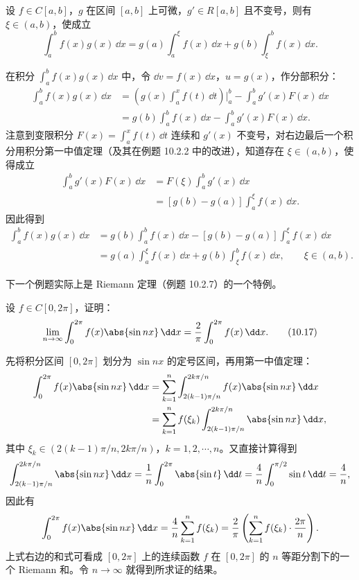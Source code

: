\begin{xexample}[10.4.11]
设 $f\in C[a,b]$，$g$ 在区间 $[a,b]$ 上可微，$g'\in R[a,b]$ 且不变号，则有 $\xi\in(a,b)$，使成立
\[
  \int_a^b f(x)g(x)\,\dd x
  =g(a)\int_a^\xi f(x)\,\dd x+g(b)\int_\xi^b f(x)\,\dd x.
\]
\end{xexample}
\begin{xsolution}
在积分 $\int_a^b f(x)g(x)\,\dd x$ 中，令 $\dd v=f(x)\,\dd x$，$u=g(x)$，作分部积分：
\begin{align*}
  \int_a^b f(x)g(x)\,\dd x
  &=\left(g(x)\int_a^x f(t)\,\dd t\right)\Big|_a^b
    -\int_a^b g'(x)F(x)\,\dd x\\
  &=g(b)\int_a^b f(x)\,\dd x-\int_a^b g'(x)F(x)\,\dd x.
\end{align*}
注意到变限积分 $F(x)=\int_a^x f(t)\,\dd t$ 连续和 $g'(x)$ 不变号，对右边最后一个积分用积分第一中值定理（及其在例题 10.2.2 中的改进），知道存在 $\xi\in(a,b)$，使得成立
\begin{align*}
  \int_a^b g'(x)F(x)\,\dd x
  &=F(\xi)\int_a^b g'(x)\,\dd x\\
  &=[g(b)-g(a)]\int_a^\xi f(x)\,\dd x.
\end{align*}
因此得到
\begin{align*}
  \int_a^b f(x)g(x)\,\dd x
  &=g(b)\int_a^b f(x)\,\dd x-[g(b)-g(a)]\int_a^\xi f(x)\,\dd x\\
  &=g(a)\int_a^\xi f(x)\,\dd x+g(b)\int_\xi^b f(x)\,\dd x,
  \qquad \xi\in(a,b).
\end{align*}
\end{xsolution}

下一个例题实际上是 Riemann 定理（例题 10.2.7）的一个特例。

\begin{xexample}[10.4.12]
设 $f\in C[0,2\pi]$，证明：
\begin{equation}
  \lim_{n\to\infty}\int_0^{2\pi}f(x)\abs{\sin nx}\,\dd x
  =\frac2\pi\int_0^{2\pi}f(x)\,\dd x.
  \tag{10.17}
  \label{eq:10.17}
\end{equation}
\end{xexample}
\begin{xsolution}
先将积分区间 $[0,2\pi]$ 划分为 $\sin nx$ 的定号区间，再用第一中值定理：
\begin{align*}
  \int_0^{2\pi}f(x)\abs{\sin nx}\,\dd x
  &=\sum_{k=1}^n\int_{2(k-1)\pi/n}^{2k\pi/n}f(x)\abs{\sin nx}\,\dd x\\
  &=\sum_{k=1}^n f(\xi_k)\int_{2(k-1)\pi/n}^{2k\pi/n}\abs{\sin nx}\,\dd x,
\end{align*}
其中 $\xi_k\in(2(k-1)\pi/n,2k\pi/n)$，$k=1,2,\cdots,n$。又直接计算得到
\[
  \int_{2(k-1)\pi/n}^{2k\pi/n}\abs{\sin nx}\,\dd x
  =\frac1n\int_0^{2\pi}\abs{\sin t}\,\dd t
  =\frac4n\int_0^{\pi/2}\sin t\,\dd t
  =\frac4n,
\]
因此有
\[
  \int_0^{2\pi}f(x)\abs{\sin nx}\,\dd x
  =\frac4n\sum_{k=1}^n f(\xi_k)
  =\frac2\pi\left(\sum_{k=1}^n f(\xi_k)\cdot\frac{2\pi}{n}\right).
\]
上式右边的和式可看成 $[0,2\pi]$ 上的连续函数 $f$ 在 $[0,2\pi]$ 的 $n$ 等距分割下的一个 Riemann 和。令 $n\to\infty$ 就得到所求证的结果。
\end{xsolution}

